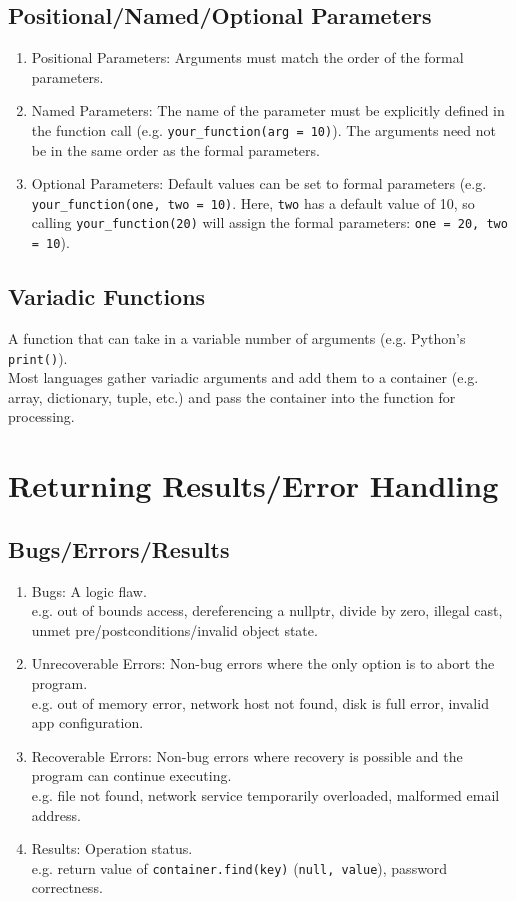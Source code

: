 \documentclass{article}
\begin{document}
\subsection{Positional/Named/Optional Parameters}
\begin{enumerate}[label=(\roman*)]
\item Positional Parameters: Arguments must match the order of the
  formal parameters.
\item Named Parameters: The name of the parameter must be explicitly
  defined in the function call (e.g. \texttt{your\_function(arg =
    10)}). The arguments need not be in the same order as the formal parameters.
\item Optional Parameters: Default values can be set to formal
  parameters (e.g. \texttt{your\_function(one, two = 10)}. Here,
  \texttt{two} has a default value of 10, so calling
  \texttt{your\_function(20)} will assign the formal parameters: \texttt{one = 20, two = 10}).
\end{enumerate}

\subsection{Variadic Functions}
A function that can take in a variable number of arguments
(e.g. Python's \texttt{print()}). \\
Most languages gather variadic arguments and add them to a container
(e.g. array, dictionary, tuple, etc.) and pass the container into the
function for processing.






\section{Returning Results/Error Handling}
\subsection{Bugs/Errors/Results}
\begin{enumerate}[label=(\roman*)]
\item Bugs: A logic flaw. \\
  e.g. out of bounds access, dereferencing a nullptr, divide by zero,
  illegal cast, unmet pre/postconditions/invalid object state. 
\item Unrecoverable Errors: Non-bug errors where the only option is to
  abort the program. \\
  e.g. out of memory error, network host not found, disk is full
  error, invalid app configuration. 
\item Recoverable Errors: Non-bug errors where recovery is possible
  and the program can continue executing. \\
  e.g. file not found, network service temporarily overloaded,
  malformed email address.
\item Results: Operation status. \\
  e.g. return value of \texttt{container.find(key)} (\texttt{null,
    value}), password correctness.
\end{enumerate}
\end{document}

